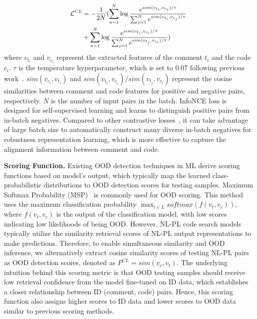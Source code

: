   
\begin{align}\small
\label{eq:infonce}
\begin{split}
    \mathcal{L}^{CL} &= -\frac{1}{2N}(\sum_{n=1}^{N}\log \frac{e^{sim(v_{t_i},v_{c_i})/\tau}}{\sum_{j=1}^{N}e^{sim(v_{t_i},v_{c_j})/\tau}}\\ &+ \sum_{n=1}^{N}\log \frac{e^{sim(v_{t_i},v_{c_i})/\tau}}{\sum_{j=1}^{N}e^{sim(v_{t_j},v_{c_i})/\tau}})
\end{split}
\end{align}
where $v_{t_i}$ and $v_{c_i}$ represent the extracted features of the comment $t_i$ and the code ${c_i}$. $\tau$ is the temperature hyperparameter, which is set to 0.07 following previous work~\cite{shi2023cocosoda}.  $sim(v_{c_i},v_{t_i})$ and $sim(v_{t_i},v_{c_j})/sim(v_{t_j},v_{c_i})$ represent the cosine similarities between comment and code features for positive and negative pairs, respectively. $N$ is the number of input pairs in the batch. InfoNCE loss is designed for self-supervised learning and learns to distinguish positive pairs from in-batch negatives. Compared to other contrastive losses~\cite{khosla2020supervised, zhou2021contrastive}, it can take advantage of large batch size to automatically construct many diverse in-batch negatives for robustness representation learning, which is more effective to capture the alignment information between comment and code. %


\textbf{Scoring Function.} Existing OOD detection techniques in ML derive scoring functions based on model's output, which typically map the learned class-probabilistic distributions to OOD detection scores for testing samples. Maximum Softmax Probability (MSP)~\cite{hendrycks2016baseline} is commonly used for OOD scoring. This method uses the maximum classification probability $\max_{l\in L}\textit{softmax}(f(v_{t}, v_{c}))$, where $f(v_{t}, v_{c})$ is the output of the classification model, with low scores indicating low likelihoods of being OOD. However, NL-PL code search models typically utilize the similarity retrieval scores of NL-PL output representations to make predictions. Therefore, to enable simultaneous similarity and OOD inference, we alternatively extract cosine similarity scores of testing NL-PL pairs as OOD detection scores, denoted as $P^{CL}=sim(v_{c},v_{t})$. The underlying intuition behind this scoring metric is that OOD testing samples should receive low retrieval confidence from the model fine-tuned on ID data, which establishes a closer relationship between ID (comment, code) pairs. Hence, this scoring function also assigns higher scores to ID data and lower scores to OOD data similar to previous scoring methods.


